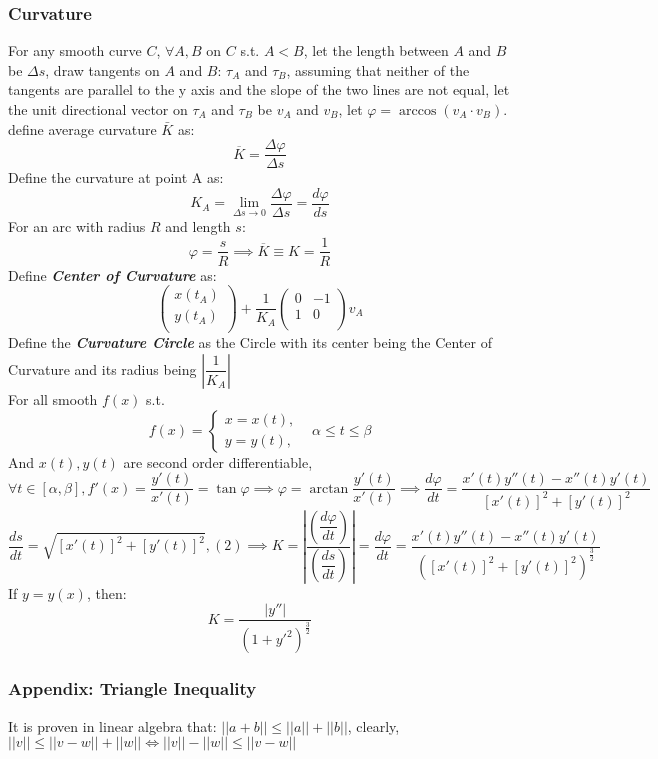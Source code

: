 \documentclass{article}
\newcommand{\0}{{\bf{0}}}
\begin{document}
\subsubsection{Curvature}
For any smooth curve $C$, $\forall{A},B$ on $C$ s.t. $A<B$, let the length between $A$ and $B$ be $\Delta{s}$, draw tangents on $A$ and $B$: $\tau_A$ and $\tau_B$, assuming that neither of the tangents are parallel to the y axis and the slope of the two lines are not equal, let the unit directional vector on $\tau_A$ and $\tau_B$ be $v_A$ and $v_B$, let $\varphi=\arccos{(v_A\cdot{v}_B)}$. define average curvature $\bar{K}$ as: $$\overline{K}=\frac{\Delta{\varphi}}{\Delta{s}}$$
Define the curvature at point A as: $$K_A=\lim_{\Delta{s}\to0}\frac{\Delta{\varphi}}{\Delta{s}}=\frac{d\varphi}{ds}$$
For an arc with radius $R$ and length $s$: $$\varphi=\frac{s}{R}\implies{\overline{K}}\equiv{K}=\frac{1}{R}$$
Define {\textit{\textbf{Center of Curvature}}} as:
\[
  {\begin{pmatrix}
    x(t_A)\\
    y(t_A)\\
  \end{pmatrix}}
  +
  \frac{1}{K_A}{\begin{pmatrix}
    0 & -1\\
    1 & 0\\
  \end{pmatrix}}v_A
\]
Define the {\textit{\textbf{Curvature Circle}}} as the Circle with its center being the Center of Curvature and its radius being $\left|\dfrac{1}{K_A}\right|$\\
For all smooth $f(x)$ s.t.
$$f(x)=\left\{
        \begin{array}{ll}
             x=x(t),&\\
             y=y(t),&
        \end{array}\alpha\le{t}\le\beta
    \right.$$
And $x(t),y(t)$ are second order differentiable, 
\begin{equation}\forall{t}\in[\alpha,\beta],f'(x)=\frac{y'(t)}{x'(t)}=\tan\varphi\implies\varphi=\arctan{\frac{y'(t)}{x'(t)}}\implies\frac{d\varphi}{dt}=\frac{x'(t)y''(t)-x''(t)y'(t)}{[x'(t)]^2+[y'(t)]^2}\end{equation}
$$\frac{ds}{dt}=\sqrt{[x'(t)]^2+[y'(t)]^2},(2)\implies{}K=\left|\frac{\left(\dfrac{d\varphi}{dt}\right)}{\left(\dfrac{ds}{dt}\right)}\right|=\frac{d\varphi}{dt}=\frac{x'(t)y''(t)-x''(t)y'(t)}{([x'(t)]^2+[y'(t)]^2)^\frac{3}{2}}$$
If $y=y(x)$, then:$$K=\frac{|y''|}{(1+y'^2)^\frac{3}{2}}$$
\subsubsection{Appendix: Triangle Inequality}
It is proven in linear algebra that: $||a+b||\le||a||+||b||$, clearly, $||v||\le||v-w||+||w||\iff||v||-||w||\le||v-w||$
\end{document}
